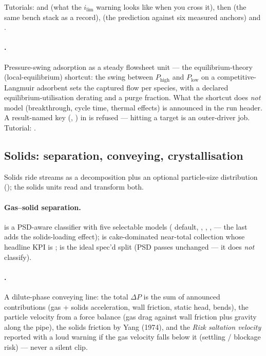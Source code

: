 \documentclass[11pt,a4paper]{article}
\begin{document}
Tutorials:  and
 (what the $i_{\lim}$ warning looks
like when you cross it), then  (the same bench
stack as a record),  (the
prediction against six measured anchors) and
.

\paragraph{.}  Pressure-swing adsorption as a steady
flowsheet unit --- the equilibrium-theory (local-equilibrium) shortcut:
the swing between $P_{\mathrm{high}}$ and $P_{\mathrm{low}}$ on a
competitive-Langmuir adsorbent sets the captured flow per species, with
a declared equilibrium-utilisation derating  and a purge
fraction.  What the shortcut does \emph{not} model (breakthrough, cycle
time, thermal effects) is announced in the run header.  A
result-named key (, ) in 
is refused --- hitting a target is an outer-driver job.  Tutorial:
.

\subsection{Solids: separation, conveying, crystallisation}\label{sec:solids}

Solids ride streams as a  decomposition
plus an optional particle-size distribution (); the solids
units read and transform both.

\paragraph{Gas--solid separation.}   is a PSD-aware
classifier with five selectable models ( default,
, , ,
 --- the last adds the solids-loading effect);
 is cake-dominated near-total collection whose headline
KPI is ;  is the ideal spec'd
split (PSD passes unchanged --- it does \emph{not} classify).

\paragraph{.}  A dilute-phase conveying line:
the total $\Delta P$ is the sum of announced contributions (gas +
solids acceleration, wall friction, static head, bends), the particle
velocity from a force balance (gas drag against wall friction plus gravity
along the pipe), the solids friction by Yang (1974), and the \emph{Rizk
saltation velocity} reported with a loud
warning if the gas velocity falls below it (settling / blockage risk)
--- never a silent clip.
\end{document}
